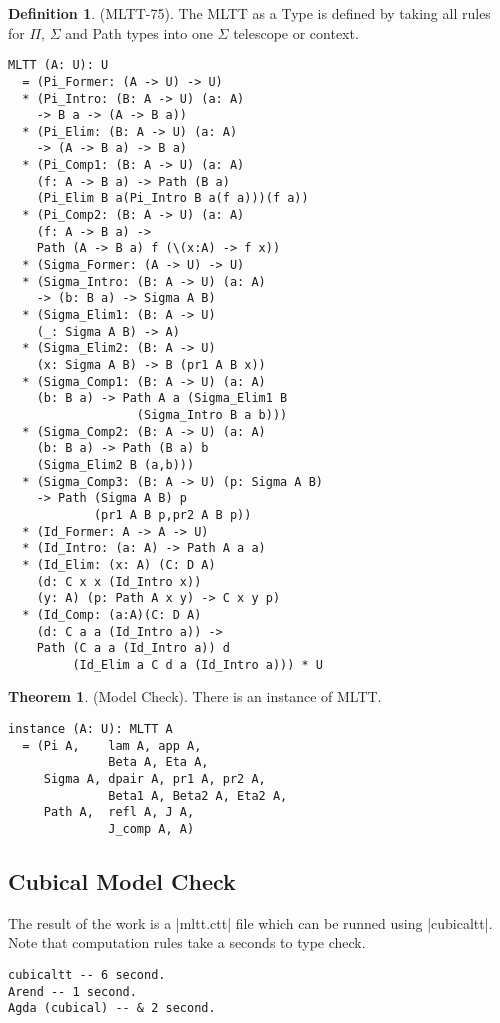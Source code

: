 \documentclass{article}
\theoremstyle{definition}
\newtheorem{theorem}{Theorem}
\newtheorem{definition}{Definition}
\begin{document}
\begin{definition} (MLTT-75).
The MLTT as a Type is defined by taking all rules
for $\Pi$, $\Sigma$ and Path types into one $\Sigma$ telescope or context.
\begin{lstlisting}[mathescape=true]
MLTT (A: U): U
  = (Pi_Former: (A -> U) -> U)
  * (Pi_Intro: (B: A -> U) (a: A)
    -> B a -> (A -> B a))
  * (Pi_Elim: (B: A -> U) (a: A)
    -> (A -> B a) -> B a)
  * (Pi_Comp1: (B: A -> U) (a: A)
    (f: A -> B a) -> Path (B a)
    (Pi_Elim B a(Pi_Intro B a(f a)))(f a))
  * (Pi_Comp2: (B: A -> U) (a: A)
    (f: A -> B a) ->
    Path (A -> B a) f (\(x:A) -> f x))
  * (Sigma_Former: (A -> U) -> U)
  * (Sigma_Intro: (B: A -> U) (a: A)
    -> (b: B a) -> Sigma A B)
  * (Sigma_Elim1: (B: A -> U)
    (_: Sigma A B) -> A)
  * (Sigma_Elim2: (B: A -> U)
    (x: Sigma A B) -> B (pr1 A B x))
  * (Sigma_Comp1: (B: A -> U) (a: A)
    (b: B a) -> Path A a (Sigma_Elim1 B
                  (Sigma_Intro B a b)))
  * (Sigma_Comp2: (B: A -> U) (a: A)
    (b: B a) -> Path (B a) b
    (Sigma_Elim2 B (a,b)))
  * (Sigma_Comp3: (B: A -> U) (p: Sigma A B)
    -> Path (Sigma A B) p
            (pr1 A B p,pr2 A B p))
  * (Id_Former: A -> A -> U)
  * (Id_Intro: (a: A) -> Path A a a)
  * (Id_Elim: (x: A) (C: D A)
    (d: C x x (Id_Intro x))
    (y: A) (p: Path A x y) -> C x y p)
  * (Id_Comp: (a:A)(C: D A)
    (d: C a a (Id_Intro a)) ->
    Path (C a a (Id_Intro a)) d
         (Id_Elim a C d a (Id_Intro a))) * U
\end{lstlisting}
\end{definition}

\begin{theorem} (Model Check).
There is an instance of MLTT.
\begin{lstlisting}
instance (A: U): MLTT A
  = (Pi A,    lam A, app A,
              Beta A, Eta A,
     Sigma A, dpair A, pr1 A, pr2 A,
              Beta1 A, Beta2 A, Eta2 A,
     Path A,  refl A, J A,
              J_comp A, A)
\end{lstlisting}
\end{theorem}

\subsection*{Cubical Model Check}

The result of the work is a |mltt.ctt| file which can be runned using |cubicaltt|.
Note that computation rules take a seconds to type check.

\begin{lstlisting}
cubicaltt -- 6 second.
Arend -- 1 second.
Agda (cubical) -- & 2 second.
\end{lstlisting}
\end{document}

